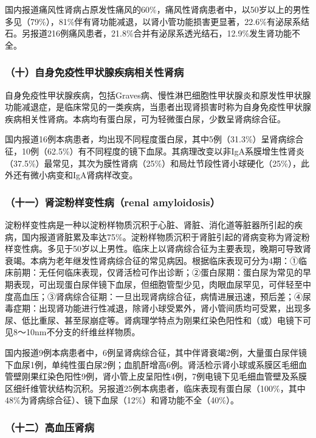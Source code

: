 国内报道痛风性肾病占原发性痛风的60\%，痛风性肾病患者中，以50岁以上的男性多见（79\%），81\%伴有肾功能减退，以肾小管功能损害更显著，22.6\%有泌尿系结石。另报道216例痛风患者，21.8\%合并有泌尿系透光结石，12.9\%发生肾功能不全。

\subsubsection{（十）自身免疫性甲状腺疾病相关性肾病}

自身免疫性甲状腺疾病，包括Graves病、慢性淋巴细胞性甲状腺炎和原发性甲状腺功能减退症，是临床常见的一类疾病，当患者出现肾损害时称为自身免疫性甲状腺疾病相关性肾病。本病均有蛋白尿，可为轻微蛋白尿，少数呈肾病综合征。

国内报道16例本病患者，均出现不同程度蛋白尿，其中5例（31.3\%）呈肾病综合征，10例（62.5\%）有不同程度的镜下血尿。其病理改变以非IgA系膜增生性肾炎（37.5\%）最常见，其次为膜性肾病（25\%）和局灶节段性肾小球硬化（25\%），此外还有微小病变和IgA肾病样改变。

\subsubsection{（十一）肾淀粉样变性病（renal amyloidosis）}

淀粉样变性病是一种以淀粉样物质沉积于心脏、肾脏、消化道等脏器所引起的疾病，国内报道肾脏累及率达75\%。淀粉样物质沉积于肾脏引起的肾病变称为肾淀粉样变性病。多见于50岁以上男性。临床上以肾病综合征为主要表现，晚期可导致肾衰竭。本病为老年继发性肾病综合征的常见病因。根据临床表现可分为4期：①临床前期：无任何临床表现，仅肾活检可作出诊断；②蛋白尿期：蛋白尿为常见的早期表现，可出现蛋白尿伴镜下血尿，但细胞管型少见，肉眼血尿罕见，可伴轻至中度高血压；③肾病综合征期：一旦出现肾病综合征，病情进展迅速，预后差；④尿毒症期：出现肾功能进行性减退，除肾小球受累外，肾小管间质均可受累，出现多尿、低比重尿、甚至尿崩症等。肾病理学特点为刚果红染色阳性和（或）电镜下可见8～10nm不分支的纤维丝样物质。

国内报道9例本病患者中，6例呈肾病综合征，其中伴肾衰竭2例，大量蛋白尿伴镜下血尿1例，单纯性蛋白尿2例；血肌酐增高6例。肾活检示肾小球或系膜区毛细血管壁刚果红染色阳性9例，肾小管上皮呈阳性4例，7例电镜下见毛细血管壁及系膜区细纤维管状结构沉积。另报道25例本病患者，临床表现有蛋白尿（100\%，其中48\%为肾病综合征）、镜下血尿（12\%）和肾功能不全（40\%）。

\subsubsection{（十二）高血压肾病}

